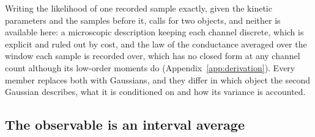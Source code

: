 Writing the likelihood of one recorded sample exactly, given the kinetic parameters and the
samples before it, calls for two objects, and neither is available here: a microscopic
description keeping each channel discrete, which is explicit and ruled out by cost, and the law
of the conductance averaged over the window each sample is recorded over, which has no closed
form at any channel count although its low-order moments do (Appendix~\ref{app:derivation}). Every member
replaces both with Gaussians, and they differ in which object the second Gaussian describes, what
it is conditioned on and how its variance is accounted.

\subsection*{The observable is an interval average}

